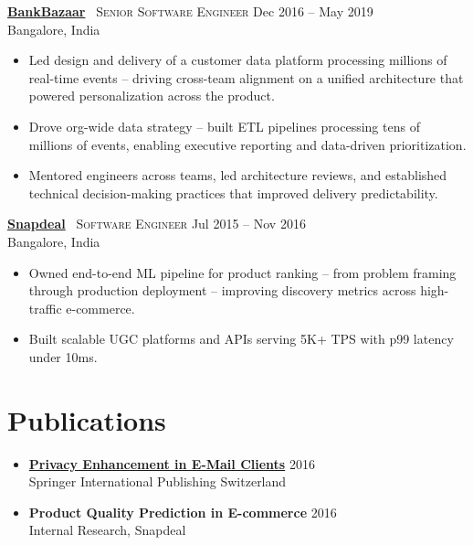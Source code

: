 \documentclass[9pt,a4paper]{article}
\newcommand{\employer}[5]{%
  \href{#5}{\textbf{#1}} \textbar\ {\small\scshape #2} \hfill {\small #3}\\[-1pt]
  {\small\color{mid} #4}%
}
\begin{document}
\begin{minipage}[t]{0.685\textwidth}
\vspace{8pt}
\employer{BankBazaar}{Senior Software Engineer}{Dec 2016 -- May 2019}{Bangalore, India}{https://www.bankbazaar.com}
\begin{itemize}
  \item Led design and delivery of a customer data platform processing millions of real-time events -- driving {\color{accent}cross-team alignment} on a unified architecture that powered personalization across the product.
  \item Drove {\color{accent}org-wide data strategy} -- built ETL pipelines processing tens of millions of events, enabling executive reporting and data-driven prioritization.
  \item Mentored engineers across teams, led architecture reviews, and established {\color{accent}technical decision-making practices} that improved delivery predictability.
\end{itemize}

\vspace{8pt}
\employer{Snapdeal}{Software Engineer}{Jul 2015 -- Nov 2016}{Bangalore, India}{https://www.snapdeal.com}
\begin{itemize}
  \item Owned end-to-end ML pipeline for product ranking -- from problem framing through production deployment -- improving discovery metrics across high-traffic e-commerce.
  \item Built scalable UGC platforms and APIs serving 5K+ TPS with p99 latency under 10ms.
\end{itemize}

\section{Publications}
\begin{itemize}[itemsep=2pt]
  \item \href{https://rd.springer.com/chapter/10.1007/978-3-319-32467-8_118}{\textbf{Privacy Enhancement in E-Mail Clients}} \hfill {\small 2016}\\[-2pt]
  {\small\color{mid} Springer International Publishing Switzerland}
  \item \textbf{Product Quality Prediction in E-commerce} \hfill {\small 2016}\\[-2pt]
  {\small\color{mid} Internal Research, Snapdeal}
\end{itemize}


\end{minipage}
\end{document}
